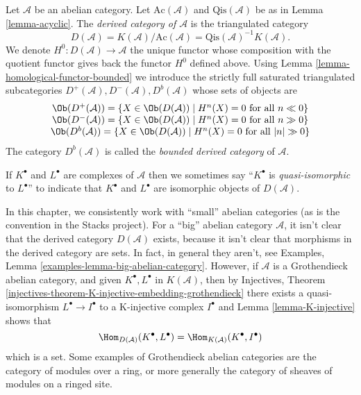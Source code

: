 \begin{definition}
\label{definition-unbounded-derived-category}
Let $\mathcal{A}$ be an abelian category.
Let $\text{Ac}(\mathcal{A})$ and $\text{Qis}(\mathcal{A})$
be as in
Lemma \ref{lemma-acyclic}.
The {\it derived category of $\mathcal{A}$} is the triangulated
category
$$
D(\mathcal{A}) =
K(\mathcal{A})/\text{Ac}(\mathcal{A}) =
\text{Qis}(\mathcal{A})^{-1} K(\mathcal{A}).
$$
We denote $H^0 : D(\mathcal{A}) \to \mathcal{A}$ the unique functor
whose composition with the quotient functor gives back the functor
$H^0$ defined above. Using
Lemma \ref{lemma-homological-functor-bounded}
we introduce the strictly full saturated triangulated subcategories
$D^{+}(\mathcal{A}), D^{-}(\mathcal{A}), D^b(\mathcal{A})$
whose sets of objects are
$$
\begin{matrix}
\Ob(D^{+}(\mathcal{A})) =
\{X \in \Ob(D(\mathcal{A})) \mid
H^n(X) = 0\text{ for all }n \ll 0\} \\
\Ob(D^{-}(\mathcal{A})) =
\{X \in \Ob(D(\mathcal{A})) \mid
H^n(X) = 0\text{ for all }n \gg 0\} \\
\Ob(D^b(\mathcal{A})) =
\{X \in \Ob(D(\mathcal{A})) \mid
H^n(X) = 0\text{ for all }|n| \gg 0\}
\end{matrix}
$$
The category $D^b(\mathcal{A})$ is called the {\it bounded derived
category} of $\mathcal{A}$.
\end{definition}

\noindent
If $K^\bullet$ and $L^\bullet$ are complexes of $\mathcal{A}$
then we sometimes say ``$K^\bullet$ is {\it quasi-isomorphic} to
$L^\bullet$'' to indicate that $K^\bullet$ and $L^\bullet$ are
isomorphic objects of $D(\mathcal{A})$.

\begin{remark}
\label{remark-existence-derived}
In this chapter, we consistently work with ``small'' abelian categories
(as is the convention in the Stacks project). For a ``big'' abelian
category $\mathcal{A}$, it isn't clear that the derived category
$D(\mathcal{A})$ exists, because it isn't clear that morphisms in the
derived category are sets. In fact, in general they aren't, see
Examples, Lemma \ref{examples-lemma-big-abelian-category}.
However, if $\mathcal{A}$ is a Grothendieck abelian category, and given
$K^\bullet, L^\bullet$ in $K(\mathcal{A})$, then by
Injectives, Theorem \ref{injectives-theorem-K-injective-embedding-grothendieck}
there exists a quasi-isomorphism $L^\bullet \to I^\bullet$ to a
K-injective complex $I^\bullet$ and Lemma \ref{lemma-K-injective} shows that
$$
\Hom_{D(\mathcal{A})}(K^\bullet, L^\bullet) =
\Hom_{K(\mathcal{A})}(K^\bullet, I^\bullet)
$$
which is a set. Some examples of Grothendieck abelian categories
are the category of modules over a ring, or more generally
the category of sheaves of modules on a ringed site.
\end{remark}

